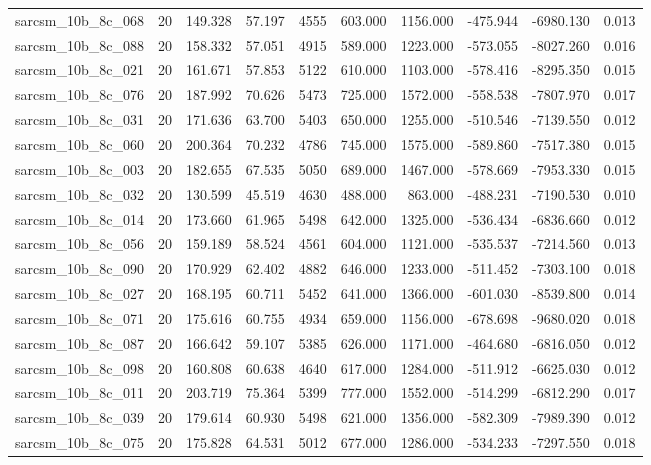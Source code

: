 \begin{tabular}{lrrrrrrrrr}
sarcsm\_10b\_8c\_068 & 20 & 149.328 & 57.197 & 4555 & 603.000 & 1156.000 & -475.944 & -6980.130 & 0.013 \\
sarcsm\_10b\_8c\_088 & 20 & 158.332 & 57.051 & 4915 & 589.000 & 1223.000 & -573.055 & -8027.260 & 0.016 \\
sarcsm\_10b\_8c\_021 & 20 & 161.671 & 57.853 & 5122 & 610.000 & 1103.000 & -578.416 & -8295.350 & 0.015 \\
sarcsm\_10b\_8c\_076 & 20 & 187.992 & 70.626 & 5473 & 725.000 & 1572.000 & -558.538 & -7807.970 & 0.017 \\
sarcsm\_10b\_8c\_031 & 20 & 171.636 & 63.700 & 5403 & 650.000 & 1255.000 & -510.546 & -7139.550 & 0.012 \\
sarcsm\_10b\_8c\_060 & 20 & 200.364 & 70.232 & 4786 & 745.000 & 1575.000 & -589.860 & -7517.380 & 0.015 \\
sarcsm\_10b\_8c\_003 & 20 & 182.655 & 67.535 & 5050 & 689.000 & 1467.000 & -578.669 & -7953.330 & 0.015 \\
sarcsm\_10b\_8c\_032 & 20 & 130.599 & 45.519 & 4630 & 488.000 & 863.000 & -488.231 & -7190.530 & 0.010 \\
sarcsm\_10b\_8c\_014 & 20 & 173.660 & 61.965 & 5498 & 642.000 & 1325.000 & -536.434 & -6836.660 & 0.012 \\
sarcsm\_10b\_8c\_056 & 20 & 159.189 & 58.524 & 4561 & 604.000 & 1121.000 & -535.537 & -7214.560 & 0.013 \\
sarcsm\_10b\_8c\_090 & 20 & 170.929 & 62.402 & 4882 & 646.000 & 1233.000 & -511.452 & -7303.100 & 0.018 \\
sarcsm\_10b\_8c\_027 & 20 & 168.195 & 60.711 & 5452 & 641.000 & 1366.000 & -601.030 & -8539.800 & 0.014 \\
sarcsm\_10b\_8c\_071 & 20 & 175.616 & 60.755 & 4934 & 659.000 & 1156.000 & -678.698 & -9680.020 & 0.018 \\
sarcsm\_10b\_8c\_087 & 20 & 166.642 & 59.107 & 5385 & 626.000 & 1171.000 & -464.680 & -6816.050 & 0.012 \\
sarcsm\_10b\_8c\_098 & 20 & 160.808 & 60.638 & 4640 & 617.000 & 1284.000 & -511.912 & -6625.030 & 0.012 \\
sarcsm\_10b\_8c\_011 & 20 & 203.719 & 75.364 & 5399 & 777.000 & 1552.000 & -514.299 & -6812.290 & 0.017 \\
sarcsm\_10b\_8c\_039 & 20 & 179.614 & 60.930 & 5498 & 621.000 & 1356.000 & -582.309 & -7989.390 & 0.012 \\
sarcsm\_10b\_8c\_075 & 20 & 175.828 & 64.531 & 5012 & 677.000 & 1286.000 & -534.233 & -7297.550 & 0.018 \\

\end{tabular}
